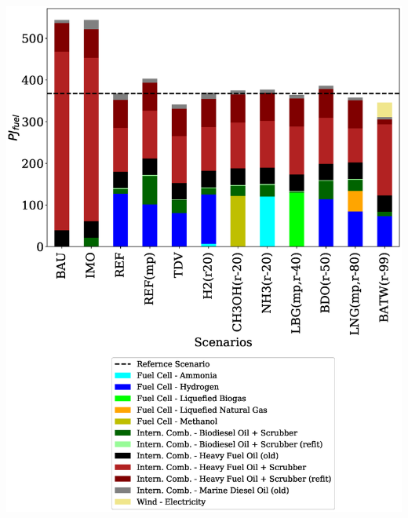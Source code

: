 \documentclass[article]{elsarticle}
\begin{document}
\noindent
\begin{minipage}[t]{0.49\textwidth}
    \centering
    \captionsetup{justification=centering}
    \includegraphics[width=.95\textwidth]{figures/AllFuelTotal.eps}
    \label{fig:AllFuelTotal}
\end{minipage}
\end{document}
